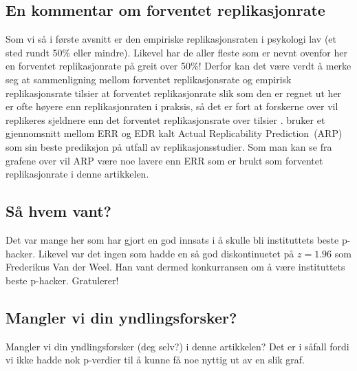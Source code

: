 \documentclass[doc,norsk]{apa7}
\begin{document}
\subsection{En kommentar om forventet replikasjonrate}
Som vi så i første avsnitt er den empiriske replikasjonsraten i psykologi lav (et sted rundt 50\% eller mindre). Likevel har de aller fleste som er nevnt ovenfor her en forventet replikasjonrate på greit over 50\%! Derfor kan det være verdt å merke seg at sammenligning mellom forventet replikasjonsrate og empirisk replikasjonsrate tilsier at forventet replikasjonrate slik som den er regnet ut her er ofte høyere enn replikasjonraten i praksis, så det er fort at forskerne over vil replikeres sjeldnere enn det forventet replikasjonsrate over tilsier \parencite{z-curve-implementasjon, z-curve-mot-empiri}. \textcite{arp} bruker et gjennomsnitt mellom ERR og EDR kalt \guillemetleft Actual Replicability Prediction\guillemetright\ (ARP) som sin beste prediksjon på utfall av replikasjonsstudier. Som man kan se fra grafene over vil ARP være noe lavere enn ERR som er brukt som forventet replikasjonrate i denne artikkelen.

\subsection{Så hvem vant?}
Det var mange her som har gjort en god innsats i å skulle bli instituttets beste p-hacker. Likevel var det ingen som hadde en så god diskontinuetet på $z=1.96$ som Frederikus Van der Weel. Han vant dermed konkurransen om å være instituttets beste p-hacker. Gratulerer!

\subsection{Mangler vi din yndlingsforsker?}

Mangler vi din yndlingsforsker (deg selv?) i denne artikkelen? Det er i såfall fordi vi ikke hadde nok p-verdier til å kunne få noe nyttig ut av en slik graf.
\end{document}
